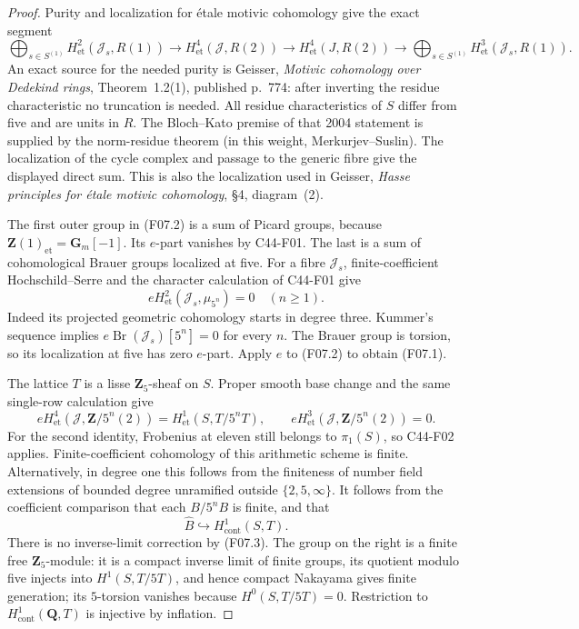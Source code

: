 \documentclass[11pt]{article}
\theoremstyle{remark}\newtheorem{remark}[theorem]{Remark}
\begin{document}
\begin{proof}
Purity and localization for \'etale motivic cohomology
give the exact segment
\[
 \bigoplus_{s\in S^{(1)}}
 H^2_{\mathrm{et}}(\mathcal J_s,R(1))
 \longrightarrow H^4_{\mathrm{et}}(\mathcal J,R(2))
 \longrightarrow H^4_{\mathrm{et}}(J,R(2))
 \longrightarrow\bigoplus_{s\in S^{(1)}}
 H^3_{\mathrm{et}}(\mathcal J_s,R(1)).
                                                        \tag{F07.2}
\]
An exact source for the needed purity is Geisser,
\emph{Motivic cohomology over Dedekind rings},
Theorem~1.2(1), published p.~774: after inverting the residue
characteristic no truncation is needed.  All residue
characteristics of $S$ differ from five and are units in $R$.
The Bloch--Kato premise of that 2004 statement is supplied by
the norm-residue theorem (in this weight, Merkurjev--Suslin).
The localization of the cycle complex and passage to the
generic fibre give the displayed direct sum.  This is also
the localization used in Geisser, \emph{Hasse principles for
\'etale motivic cohomology}, \S4, diagram~(2).

The first outer group in (F07.2) is a sum of Picard groups,
because $\mathbf Z(1)_{\mathrm{et}}=\mathbf G_m[-1]$.
Its $e$-part vanishes by C44-F01.  The last is a sum of
cohomological Brauer groups localized at five.  For a fibre
$\mathcal J_s$, finite-coefficient Hochschild--Serre and the
character calculation of C44-F01 give
\[
           eH^2_{\mathrm{et}}(\mathcal J_s,\mu_{5^n})=0
           \quad(n\ge1).
\]
Indeed its projected geometric cohomology starts in degree
three.  Kummer's sequence implies
$e\operatorname{Br}(\mathcal J_s)[5^n]=0$ for every $n$.
The Brauer group is torsion, so its localization at five has
zero $e$-part.  Apply $e$ to (F07.2) to obtain (F07.1).

The lattice $T$ is a lisse $\mathbf Z_5$-sheaf on $S$.
Proper smooth base change and the same single-row calculation
give
\[
 eH^4_{\mathrm{et}}(\mathcal J,\mathbf Z/5^n(2))
          =H^1_{\mathrm{et}}(S,T/5^nT),
 \qquad eH^3_{\mathrm{et}}(\mathcal J,\mathbf Z/5^n(2))=0.
                                                        \tag{F07.3}
\]
For the second identity, Frobenius at eleven still belongs
to $\pi_1(S)$, so C44-F02 applies.  Finite-coefficient
cohomology of this arithmetic scheme is finite.  Alternatively,
in degree one this follows from the finiteness of number
field extensions of bounded degree unramified outside
$\{2,5,\infty\}$.
It follows from the coefficient comparison that each
$B/5^nB$ is finite, and that
\[
 \widehat B\hookrightarrow
           H^1_{\mathrm{cont}}(S,T).
                                                        \tag{F07.4}
\]
There is no inverse-limit correction by (F07.3).
The group on the right is a finite free $\mathbf Z_5$-module:
it is a compact inverse limit of finite groups, its quotient
modulo five injects into $H^1(S,T/5T)$, and hence compact
Nakayama gives finite generation; its $5$-torsion vanishes
because $H^0(S,T/5T)=0$.  Restriction to
$H^1_{\mathrm{cont}}(\mathbf Q,T)$ is injective by inflation.


\end{proof}
\end{document}
